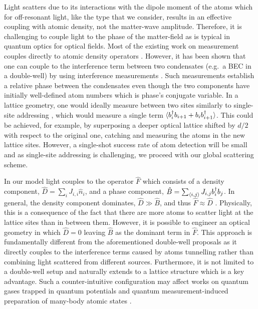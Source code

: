 Light scatters due to its interactions with the dipole moment of the
atoms which for off-resonant light, like the type that we consider,
results in an effective coupling with atomic density, not the
matter-wave amplitude. Therefore, it is challenging to couple light to
the phase of the matter-field as is typical in quantum optics for
optical fields. Most of the existing work on measurement couples
directly to atomic density operators \cite{mekhov2012, LP2009,
  rogers2014, ashida2015, ashida2015a}. However, it has been shown
that one can couple to the interference term between two condensates
(e.g.~a BEC in a double-well) by using interference measurements
\cite{cirac1996, castin1997, ruostekoski1997, ruostekoski1998,
  rist2012}. Such measurements establish a relative phase between the
condensates even though the two components have initially well-defined
atom numbers which is phase's conjugate variable. In a lattice
geometry, one would ideally measure between two sites similarly to
single-site addressing \cite{greiner2009, bloch2011}, which would
measure a single term $\langle b^\dagger_i b_{i+1}+b_i
b^\dagger_{i+1}\rangle$. This could be achieved, for example, by superposing
a deeper optical lattice shifted by $d/2$ with respect to the original
one, catching and measuring the atoms in the new lattice
sites. However, a single-shot success rate of atom detection will be
small and as single-site addressing is challenging, we proceed with
our global scattering scheme.

In our model light couples to the operator $\hat{F}$ which consists of
a density component, $\hat{D} = \sum_i J_{i,i} \hat{n}_i$, and a phase
component, $\hat{B} = \sum_{\langle i, j \rangle} J_{i,j} b^\dagger_i
b_j$. In general, the density component dominates, $\hat{D} \gg
\hat{B}$, and thus $\hat{F} \approx \hat{D}$
\cite{mekhov2012}. Physically, this is a consequence of the fact that
there are more atoms to scatter light at the lattice sites than in
between them. However, it is possible to engineer an optical geometry
in which $\hat{D} = 0$ leaving $\hat{B}$ as the dominant term in
$\hat{F}$. This approach is fundamentally different from the
aforementioned double-well proposals as it directly couples to the
interference terms caused by atoms tunnelling rather than combining
light scattered from different sources. Furthermore, it is not limited
to a double-well setup and naturally extends to a lattice structure
which is a key advantage. Such a counter-intuitive configuration may
affect works on quantum gases trapped in quantum potentials
\cite{mekhov2012, caballero2015, mekhov2008, larson2008, chen2009,
  habibian2013, ivanov2014} and quantum measurement-induced
preparation of many-body atomic states \cite{mekhov2009prl,
  elliott2015, mazzucchi2016, pedersen2014}.

